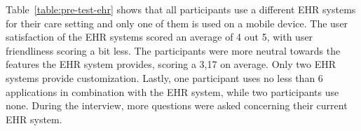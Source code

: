     \begin{table}[!t]
        \caption{Pre-test results: general participant information}\label{table:pre-test}
    \end{table}

    Table~\ref{table:pre-test-ehr} shows that all participants use a different EHR systems for their care setting and only one of them is used on a mobile device. The user satisfaction of the EHR systems scored an average of 4 out 5, with user friendliness scoring a bit less. The participants were more neutral towards the features the EHR system provides, scoring a 3,17 on average. Only two EHR systems provide customization. Lastly, one participant uses no less than 6 applications in combination with the EHR system, while two participants use none. During the interview, more questions were asked concerning their current EHR system.


